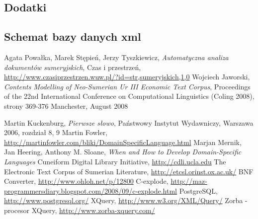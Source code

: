 \documentclass{pracamgr}
\begin{document}
\begin{appendix}
\part*{Dodatki}

\chapter{Schemat bazy danych xml}
\label{appendix:xmlsch}





\end{appendix}

\begin{thebibliography}{99}
 Agata Powałka, Marek Stępień, Jerzy Tyszkiewicz, \textit{Automatyczna analiza dokumentów sumeryjskich}, 
Czas i przestrzeń, \url{http://www.czasiprzestrzen.wuw.pl/?id=str,sumeryjskich,1,0}
 Wojciech Jaworski, \textit{Contents Modelling of Neo-Sumerian Ur III Economic Text Corpus}, 
Proceedings of the 22nd International Conference on Computational Linguistics (Coling 2008), strony 369-376
Manchester, August 2008

 Martin Kuckenburg, \textit{Pierwsze słowo}, Państwowy Instytut Wydawniczy, Warszawa 2006, rozdział 8, 9
 Martin Fowler, \url{http://martinfowler.com/bliki/DomainSpecificLanguage.html}
 Marjan Mernik, Jan Heering, Anthony M. Sloane, \textit{When and How to Develop Domain-Specific Languages}
 Cuneiform Digital Library Initiative, \url{http://cdli.ucla.edu}
 The Electronic Text Corpus of Sumerian Literature, \url{http://etcsl.orinst.ox.ac.uk/}
 BNF Converter, \url{http://www.ohloh.net/p/12800} %
 C-explode, \url{http://maz-programmersdiary.blogspot.com/2008/09/c-explode.html}
 PostgreSQL, \url{http://www.postgresql.org/}
 XQuery, \url{http://www.w3.org/XML/Query/}
 Zorba - procesor XQuery, \url{http://www.zorba-xquery.com/}



\end{thebibliography}

\listoffigures
\end{document}
